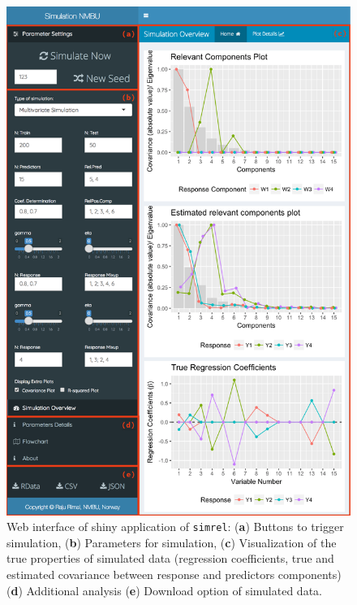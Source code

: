 \documentclass[review]{elsarticle}
\theoremstyle{definition}
\theoremstyle{definition}
\theoremstyle{definition}
\theoremstyle{remark}
\begin{document}
\begin{figure}[!ht]

{\centering \includegraphics[width=0.98\linewidth]{images/AppSimrel} 

}

\caption{Web interface of shiny application of \texttt{simrel}:
(\textbf{a}) Buttons to trigger simulation, (\textbf{b}) Parameters for
simulation, (\textbf{c}) Visualization of the true properties of
simulated data (regression coefficients, true and estimated covariance
between response and predictors components) (\textbf{d}) Additional
analysis (\textbf{e}) Download option of simulated data.}\label{fig:AppSimulatr}
\end{figure}
\end{document}
